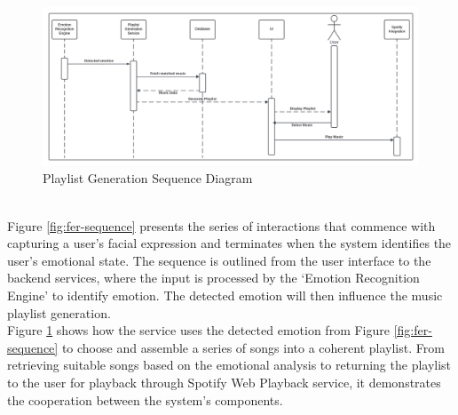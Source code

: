\begin{figure}[!ht]
    \centering
    \includegraphics[width=14cm]{Images/playlist-sequence.png}
    \caption{Playlist Generation Sequence Diagram}
    \label{fig:playlist-sequence}
\end{figure}
\\
\indent Figure \ref{fig:fer-sequence} presents the series of interactions that commence with capturing a user's facial expression and terminates when the system identifies the user's emotional state.
The sequence is outlined from the user interface to the backend services, where the input is processed by the `Emotion Recognition Engine' to identify emotion. 
The detected emotion will then influence the music playlist generation. 
\\
\indent Figure \ref{fig:playlist-sequence} shows how the service uses the detected emotion from Figure \ref{fig:fer-sequence} to choose and assemble a series of songs into a coherent playlist.
From retrieving suitable songs based on the emotional analysis to returning the playlist to the user for playback through Spotify Web Playback service, it demonstrates the cooperation between the system's components.
\\
